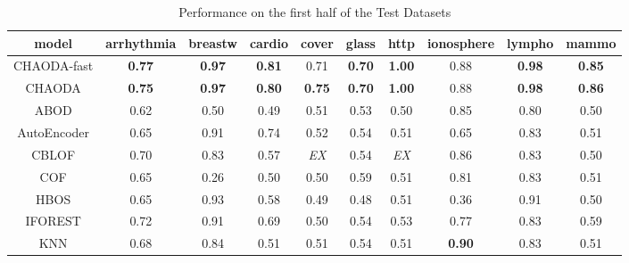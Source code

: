 \begin{table*}[!t]
\renewcommand{\arraystretch}{1.25}
\caption{Performance on the first half of the Test Datasets}
\label{table:results:test-performance-1}
\centering
\begin{tabular}{|c|c|c|c|c|c|c|c|c|c|}
\hline
\textbf{model} & \textbf{arrhythmia} & \textbf{breastw} & \textbf{cardio} & \textbf{cover} & \textbf{glass} & \textbf{http} & \textbf{ionosphere} & \textbf{lympho} & \textbf{mammo} \\
\hline
        CHAODA-fast &       \textbf{0.77} &    \textbf{0.97} &   \textbf{0.81} &           0.71 &  \textbf{0.70} & \textbf{1.00} &                0.88 &   \textbf{0.98} &  \textbf{0.85} \\
\hline
        CHAODA &       \textbf{0.75} &    \textbf{0.97} &   \textbf{0.80} &  \textbf{0.75} &  \textbf{0.70} & \textbf{1.00} &                0.88 &   \textbf{0.98} &  \textbf{0.86} \\
\hline
                ABOD &                0.62 &             0.50 &            0.49 &           0.51 &           0.53 &          0.50 &                0.85 &            0.80 &           0.50 \\
\hline
        AutoEncoder &                0.65 &             0.91 &            0.74 &           0.52 &           0.54 &          0.51 &                0.65 &            0.83 &           0.51 \\
\hline
                CBLOF &                0.70 &             0.83 &            0.57 &    \textit{EX} &           0.54 &   \textit{EX} &                0.86 &            0.83 &           0.50 \\
\hline
                COF &                0.65 &             0.26 &            0.50 &           0.50 &           0.59 &          0.51 &                0.81 &            0.83 &           0.51 \\
\hline
                HBOS &                0.65 &             0.93 &            0.58 &           0.49 &           0.48 &          0.51 &                0.36 &            0.91 &           0.50 \\
\hline
        IFOREST &                0.72 &             0.91 &            0.69 &           0.50 &           0.54 &          0.53 &                0.77 &            0.83 &           0.59 \\
\hline
                KNN &                0.68 &             0.84 &            0.51 &           0.51 &           0.54 &          0.51 &       \textbf{0.90} &            0.83 &           0.51 \\

\end{tabular}
\end{table*}
